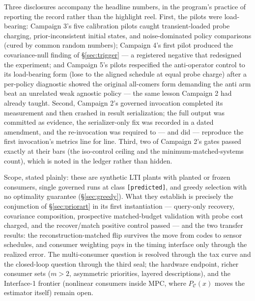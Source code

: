 \documentclass{article}
\theoremstyle{definition}
\theoremstyle{remark}
\newcommand{\PC}{P_{\mathcal{C}}}
\begin{document}
Three disclosures accompany the headline numbers, in the program's practice
of reporting the record rather than the highlight reel. First, the pilots
were load-bearing: Campaign 3's five calibration pilots caught
transient-loaded probe charging, prior-inconsistent initial states, and
noise-dominated policy comparisons (cured by common random numbers);
Campaign 4's first pilot produced the covariance-null finding of
\S\ref{sec:trigger} --- a registered negative that redesigned the
experiment; and Campaign 5's pilots respecified the anti-operator control
to its load-bearing form (lose to the aligned schedule at equal probe
charge) after a per-policy diagnostic showed the original all-comers form
demanding the anti arm beat an unrelated weak agnostic policy --- the same
lesson Campaign 2 had already taught. Second, Campaign 2's governed
invocation completed its
measurement and then crashed in result serialization; the full output was
committed as evidence, the serializer-only fix was recorded in a dated
amendment, and the re-invocation was required to --- and did --- reproduce
the first invocation's metrics line for line. Third, two of Campaign 2's
gates passed exactly at their bars (the iso-control ceiling and the
minimum-matched-systems count), which is noted in the ledger rather than
hidden.

Scope, stated plainly: these are synthetic LTI plants with planted or frozen
consumers, single governed runs at class \texttt{[predicted]}, and greedy
selection with no optimality guarantee (\S\ref{sec:greedy}). What they
establish is precisely the conjunction of \S\ref{sec:priorart} in its first
instantiation --- query-only recovery, covariance composition, prospective
matched-budget validation with probe cost charged, and the recover/match
positive control passed --- and the two transfer results: the
reconstruction-matched flip survives the move from codes to sensor
schedules, and consumer weighting pays in the timing interface only through
the realized error. The multi-consumer question is resolved through the tax
curve and the closed-loop question through the third seal; the hardware
endpoint, richer consumer sets ($m>2$, asymmetric priorities, layered
descriptions), and the Interface-1 frontier (nonlinear consumers inside
MPC, where $\PC(x)$ moves the estimator itself) remain open.
\end{document}
